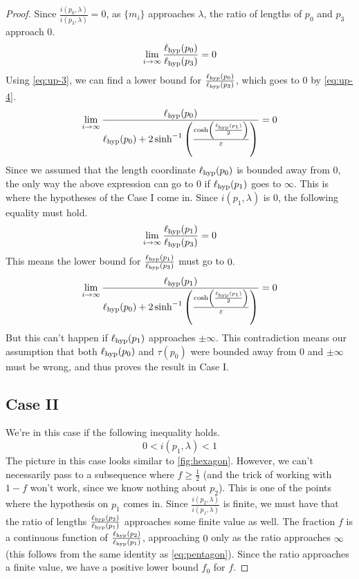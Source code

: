 \documentclass[12pt, reqno]{amsart}
\begin{document}
\begin{proof}
Since $\frac{i(p_0, \lambda)}{i(p_3, \lambda)} = 0$, as $\{m_i\}$ approaches $\lambda$, the ratio of lengths of $p_0$ and $p_3$ approach $0$.
\begin{equation}
  \label{eq:up-4}
  \lim_{i \to \infty} \frac{\ell_{\mathrm{hyp}}(p_0)}{\ell_{\mathrm{hyp}}(p_3)} = 0
\end{equation}
Using \eqref{eq:up-3}, we can find a lower bound for $\frac{\ell_{\mathrm{hyp}}(p_0)}{\ell_{\mathrm{hyp}}(p_3)}$, which goes to $0$ by \eqref{eq:up-4}.
\begin{equation}
  \label{eq:up-5}
  \lim_{i \to \infty} \frac{\ell_{\mathrm{hyp}}(p_0)}{  \ell_{\mathrm{hyp}}(p_0) +
  2 \sinh^{-1} \left( \frac{\cosh \left( \frac{\ell_{\mathrm{hyp}}(p_1)}{2} \right)}{\varepsilon} \right)} = 0
\end{equation}
Since we assumed that the length coordinate $\ell_{\mathrm{hyp}}(p_0)$ is bounded away from $0$, the only way the above expression can go to $0$ if $\ell_{\mathrm{hyp}}(p_1)$ goes to $\infty$.
This is where the hypotheses of the Case I come in.
Since $i(p_1, \lambda)$ is $0$, the following equality must hold.
\begin{equation}
  \label{eq:up-6}
  \lim_{i \to \infty} \frac{\ell_{\mathrm{hyp}}(p_1)}{\ell_{\mathrm{hyp}}(p_3)} = 0
\end{equation}
This means the lower bound for $\frac{\ell_{\mathrm{hyp}}(p_1)}{\ell_{\mathrm{hyp}}(p_3)}$ must go to $0$.
\begin{equation}
  \label{eq:up-7}
   \lim_{i \to \infty} \frac{\ell_{\mathrm{hyp}}(p_1)}{  \ell_{\mathrm{hyp}}(p_0) +
  2 \sinh^{-1} \left( \frac{\cosh \left( \frac{\ell_{\mathrm{hyp}}(p_1)}{2} \right)}{\varepsilon} \right)
  } = 0
\end{equation}
But this can't happen if $\ell_{\mathrm{hyp}}(p_1)$ approaches $\pm \infty$.
This contradiction means our assumption that both $\ell_{\mathrm{hyp}}(p_0)$ and $\tau(p_0)$ were bounded away from $0$ and $\pm \infty$ must be wrong, and thus proves the result in Case I.

\subsection*{Case II}
We're in this case if the following inequality holds.
\begin{equation}
  \label{eq:up-8}
  0 < i(p_1, \lambda) < 1
\end{equation}
The picture in this case looks similar to \autoref{fig:hexagon}.
However, we can't necessarily pass to a subsequence where $f \geq \frac{1}{2}$ (and the trick of working with $1-f$ won't work, since we know nothing about $p_2$).
This is one of the points where the hypothesis on $p_1$ comes in.
Since $\frac{i(p_2, \lambda)}{i(p_1, \lambda)}$ is finite, we must have that the ratio of lengths $\frac{\ell_{\mathrm{hyp}}(p_2)}{\ell_{\mathrm{hyp}}(p_1)}$ approaches some finite value as well.
The fraction $f$ is a continuous function of $\frac{\ell_{\mathrm{hyp}}(p_2)}{\ell_{\mathrm{hyp}}(p_1)}$, approaching $0$ only as the ratio approaches $\infty$ (this follows from the same identity as \eqref{eq:pentagon}). Since the ratio approaches a finite value, we have a positive lower bound $f_0$ for $f$.


\end{proof}
\end{document}
